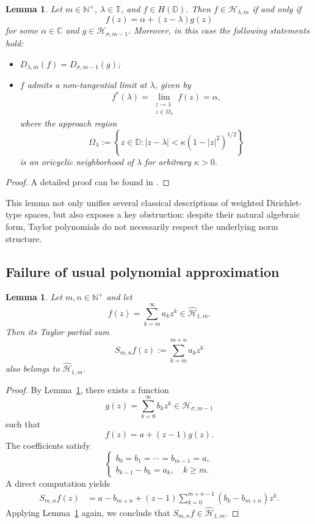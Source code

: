 \documentclass[12pt,reqno]{amsart}
\newtheorem{lemma}[theorem]{Lemma}
\begin{document}
\begin{lemma}\label{lm2.1}
Let \( m \in \mathbb{N}^{+} \), \( \lambda \in \mathbb{T} \), and \( f \in H(\mathbb{D}) \).
Then \( f \in \mathcal{H}_{\lambda,m} \) if and only if
\[
f(z) = \alpha + (z - \lambda)g(z)
\]
for some \( \alpha \in \mathbb{C} \) and \( g \in \mathcal{H}_{\sigma,m-1} \).
Moreover, in this case the following statements hold:
\begin{itemize}
\item[(i)] \( D_{\lambda,m}(f) = D_{\sigma,m-1}(g) \);
\item[(ii)] \( f \) admits a non-tangential limit at \( \lambda \), given by
\[
f^*(\lambda) = \lim_{\substack{z \to \lambda \\ z \in \Omega_\lambda}} f(z) = \alpha,
\]
where the approach region
\[
\Omega_\lambda := \left\{ z \in \mathbb{D} : |z - \lambda| < \kappa (1 - |z|^2)^{1/2} \right\}
\]
is an oricyclic neighborhood of \( \lambda \) for arbitrary \( \kappa > 0 \).
\end{itemize}
\end{lemma}

\begin{proof}
A detailed proof can be found in \cite{MR4588160}.
\end{proof}

This lemma not only unifies several classical descriptions of weighted Dirichlet-type spaces, but also exposes a key obstruction: despite their natural algebraic form, Taylor polynomials do not necessarily respect the underlying norm structure.

\subsection{Failure of usual polynomial approximation}

\begin{lemma}\label{lm3.1}
Let $m,n \in \mathbb{N}^{+}$ and let
\[
f(z) = \sum_{k=m}^{\infty} a_k z^k \in \widehat{\mathcal{H}}_{1,m}.
\]
Then its Taylor partial sum
\[
S_{m,n}f(z) := \sum_{k=m}^{m+n} a_k z^k
\]
also belongs to $\widehat{\mathcal{H}}_{1,m}$.
\end{lemma}

\begin{proof}
By Lemma~\ref{lm2.1}, there exists a function
\[
g(z) = \sum_{k=0}^{\infty} b_k z^k \in \mathcal{H}_{\sigma,m-1}
\]
such that
\[
f(z) = a + (z-1)g(z).
\]
The coefficients satisfy
\[
\begin{cases}
b_0 = b_1 = \cdots = b_{m-1} = a,\\
b_{k-1} - b_k = a_k, \quad k \ge m.
\end{cases}
\]
A direct computation yields
\begin{align*}
S_{m,n}f(z)
&= a - b_{m+n} + (z-1)\sum_{k=0}^{m+n-1} (b_k - b_{m+n})z^k.
\end{align*}
Applying Lemma~\ref{lm2.1} again, we conclude that $S_{m,n}f \in \widehat{\mathcal{H}}_{1,m}$.
\end{proof}
\end{document}

